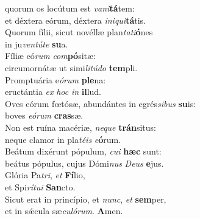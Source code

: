 \evenverse  quorum os locútum est \textit{va}\textit{ni}\textbf{tá}tem:~\*\\
\evenverse et déxtera eórum, déxtera \textit{i}\textit{ni}\textit{qui}\textbf{tá}tis.\\
\oddverse Quorum fílii, sicut novéllæ plan\textit{ta}\textit{ti}\textbf{ó}nes~\*\\
\oddverse in ju\textit{ven}\textit{tú}\textit{te} \textbf{su}a.\\
\evenverse Fíliæ eó\textit{rum} \textit{com}\textbf{pó}sitæ:~\*\\
\evenverse circumornátæ ut simi\textit{li}\textit{tú}\textit{do} \textbf{tem}pli.\\
\oddverse Promptuária e\textit{ó}\textit{rum} \textbf{ple}na:~\*\\
\oddverse eructántia \textit{ex} \textit{hoc} \textit{in} \textbf{il}lud.\\
\evenverse Oves eórum fœtósæ, abundántes in egrés\textit{si}\textit{bus} \textbf{su}is:~\*\\
\evenverse boves \textit{e}\textit{ó}\textit{rum} \textbf{cras}sæ.\\
\oddverse Non est ruína macériæ, \textit{ne}\textit{que} \textbf{trán}situs:~\*\\
\oddverse neque clamor in pla\textit{té}\textit{is} \textit{e}\textbf{ó}rum.\\
\evenverse Beátum dixérunt pópulum, \textit{cu}\textit{i} \textbf{hæc} sunt:~\*\\
\evenverse beátus pópulus, cujus Dómi\textit{nus} \textit{De}\textit{us} \textbf{e}jus.\\
\oddverse Glória Pa\textit{tri}, \textit{et} \textbf{Fí}lio,~\*\\
\oddverse et Spi\textit{rí}\textit{tu}\textit{i} \textbf{San}cto.\\
\evenverse Sicut erat in princípio, et \textit{nunc}, \textit{et} \textbf{sem}per,~\*\\
\evenverse et in sǽcula sæ\textit{cu}\textit{ló}\textit{rum}. \textbf{A}men.\\
